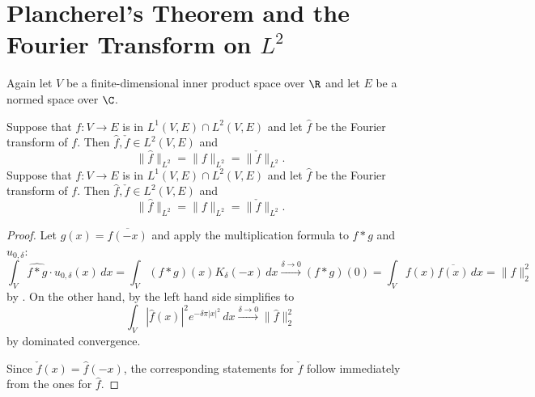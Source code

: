 \section{\texorpdfstring{Plancherel's Theorem and the Fourier Transform on $L^2$}
                        {Plancherel's Theorem and the Fourier Transform on L2}}
Again let $V$ be a finite-dimensional inner product space over $\R$ and let $E$ be a normed space over $\C$.
\begin{theorem}
  \label{thm:plancherel}
  \leanok %
   Suppose that $f : V \to E$ is in $L^1(V,E)\cap L^2(V,E)$ and let $\widehat{f}$ be the Fourier transform of $f$. Then $\widehat{f},\check{f}\in L^2(V,E)$ and
  \[\|\widehat{f}\|_{L^2} = \|f\|_{L^2}=\|\check f\|_{L^2}.\]
   Suppose that $f : V \to E$ is in $L^1(V,E)\cap L^2(V,E)$ and let $\widehat{f}$ be the Fourier transform of $f$. Then $\widehat{f},\check{f}\in L^2(V,E)$ and
  \[\|\widehat{f}\|_{L^2} = \|f\|_{L^2}=\|\check f\|_{L^2}.\]
  \end{theorem}
    \begin{proof}
    Let $g(x)=\overline{f(-x)}$ and apply the multiplication formula 
    to $f\ast g$ and $u_{0,\delta}$: $$\int_V\widehat{f\ast g}\cdot u_{0,\delta}(x)\,dx=\int_V(f\ast g)(x)K_\delta(-x)\,dx
    \overset{\delta\to0}\to(f\ast g)(0)=\int_Vf(x)\overline{f(x)}\,dx=\| f\|_2^2$$ by .
    On the other hand, by  the left hand side simplifies to
    $$\int_V|\widehat f(x)|^2e^{-\delta\pi|x|^2}\,dx\xrightarrow{\delta\to0}\|\widehat f\|_2^2$$ by dominated convergence.

    Since $\check f(x)=\widehat f(-x)$, the corresponding statements for $\check f$ follow immediately from the ones for $\widehat f$.
\end{proof}

